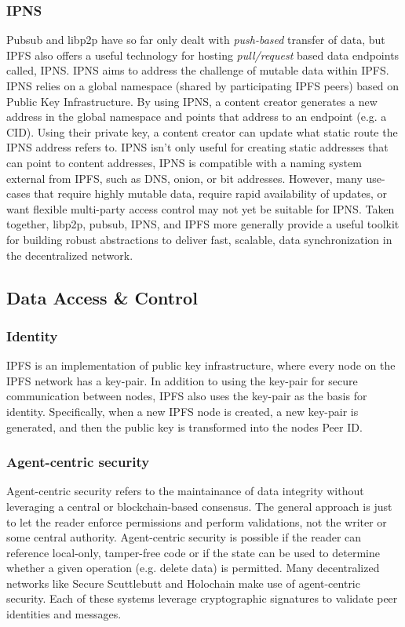 \documentclass{textile}
\begin{document}
\subsubsection{IPNS}

Pubsub and libp2p have so far only dealt with \emph{push-based} transfer of data, but IPFS also offers a useful technology for hosting \emph{pull/request} based data endpoints called, IPNS. IPNS aims to address the challenge of mutable data within IPFS. IPNS relies on a global namespace (shared by participating IPFS peers) based on Public Key Infrastructure. By using IPNS, a content creator generates a new address in the global namespace and points that address to an endpoint (e.g. a CID). Using their private key, a content creator can update what static route the IPNS address refers to. IPNS isn't only useful for creating static addresses that can point to content addresses, IPNS is compatible with a naming system external from IPFS, such as DNS, onion, or bit addresses. However, many use-cases that require highly mutable data, require rapid availability of updates, or want flexible multi-party access control may not yet be suitable for IPNS. Taken together, libp2p, pubsub, IPNS, and IPFS more generally provide a useful toolkit for building robust abstractions to deliver fast, scalable, data synchronization in the decentralized network. 

\subsection{Data Access \& Control}

\subsubsection{Identity}

IPFS is an implementation of public key infrastructure, where every node on the IPFS network has a key-pair. In addition to using the key-pair for secure communication between nodes, IPFS also uses the key-pair as the basis for identity. Specifically, when a new IPFS node is created, a new key-pair is generated, and then the public key is transformed into the nodes Peer ID. 

\subsubsection{Agent-centric security}

Agent-centric security refers to the maintainance of data integrity without leveraging a central or blockchain-based consensus.
The general approach is just to let the reader enforce permissions and perform validations, not the writer or some central authority.
Agent-centric security is possible if the reader can reference local-only, tamper-free code or if the state can be used to determine whether a given operation (e.g. delete data) is permitted.
Many decentralized networks like Secure Scuttlebutt \cite{securescuttlebuttScuttlebuttProtocolGuide} and Holochain \cite{ericharris-braunHolochainScalableAgentcentric2018} make use of agent-centric security.
Each of these systems leverage cryptographic signatures to validate peer identities and messages.
\end{document}
